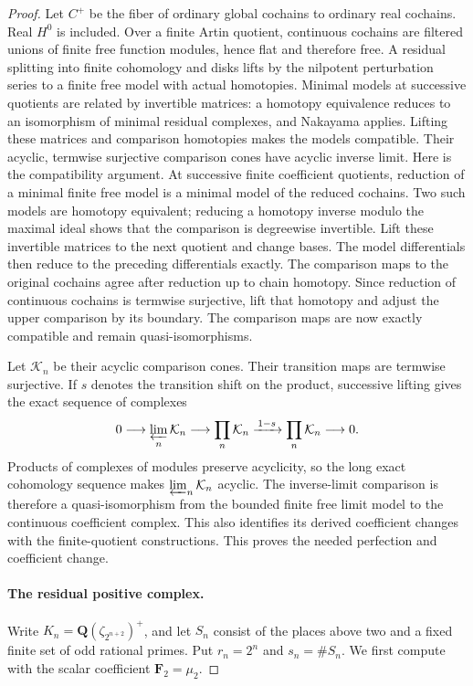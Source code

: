 \begin{proof}\leavevmode
Let $C^+$ be the fiber of ordinary global cochains to ordinary real
cochains. Real $H^0$ is included. Over a finite Artin quotient,
continuous cochains are filtered unions of finite free function
modules, hence flat and therefore free. A residual splitting into
finite cohomology and disks lifts by the nilpotent perturbation
series to a finite free model with actual homotopies. Minimal models
at successive quotients are related by invertible matrices:
a homotopy equivalence reduces to an isomorphism of minimal residual
complexes, and Nakayama applies. Lifting these matrices and comparison
homotopies makes the models compatible. Their acyclic, termwise
surjective comparison cones have acyclic inverse limit.
Here is the compatibility argument. At successive finite coefficient
quotients, reduction of a minimal finite free model is a minimal model
of the reduced cochains. Two such models are homotopy equivalent;
reducing a homotopy inverse modulo the maximal ideal shows that the
comparison is degreewise invertible. Lift these invertible matrices
to the next quotient and change bases. The model differentials then
reduce to the preceding differentials exactly. The comparison maps
to the original cochains agree after reduction up to chain homotopy.
Since reduction of continuous cochains is termwise surjective, lift
that homotopy and adjust the upper comparison by its boundary. The
comparison maps are now exactly compatible and remain
quasi-isomorphisms.

Let $\mathcal K_n$ be their acyclic comparison cones. Their transition
maps are termwise surjective. If $s$ denotes the transition shift on
the product, successive lifting gives the exact sequence of complexes
\[
 0\longrightarrow\varprojlim_n\mathcal K_n
 \longrightarrow\prod_n\mathcal K_n
 \xrightarrow{\,1-s\,}\prod_n\mathcal K_n
 \longrightarrow0.
\]
Products of complexes of modules preserve acyclicity, so the long
exact cohomology sequence makes $\varprojlim_n\mathcal K_n$ acyclic.
The inverse-limit comparison is therefore a quasi-isomorphism from
the bounded finite free limit model to the continuous coefficient
complex. This also identifies its derived coefficient changes with
the finite-quotient constructions.
This proves the needed perfection and coefficient change.

\paragraph{The residual positive complex.}
Write $K_n=\mathbf Q(\zeta_{2^{n+2}})^+$, and let $S_n$ consist of
the places above two and a fixed finite set of odd rational primes.
Put $r_n=2^n$ and $s_n=\#S_n$. We first compute with the scalar
coefficient $\mathbf F_2=\mu_2$.


\end{proof}
